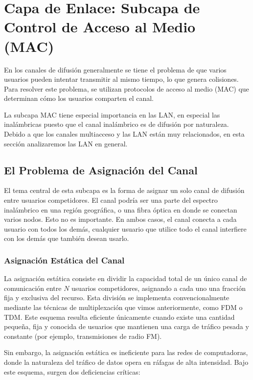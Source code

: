 \section{Capa de Enlace: Subcapa de Control de Acceso al Medio (MAC)}

En los canales de difusión generalmente se tiene el problema de que varios usuarios pueden intentar transmitir al mismo tiempo, lo que genera colisiones. Para resolver este problema, se utilizan protocolos de acceso al medio (MAC) que determinan cómo los usuarios comparten el canal. 

La subcapa MAC tiene especial importancia en las LAN, en especial las inalámbricas puesto que el canal inalámbrico es de difusión por naturaleza. Debido a que los canales multiacceso y las LAN están muy relacionados, en esta sección analizaremos las LAN en general.

\subsection{El Problema de Asignación del Canal}

El tema central de esta subcapa es la forma de asignar un solo canal de difusión entre usuarios competidores. El canal podría ser una parte del espectro inalámbrico en una región geográfica, o una fibra óptica en donde se conectan varios nodos. Esto no es importante. En ambos casos, el canal conecta a cada usuario con todos los demás, cualquier usuario que utilice todo el canal interfiere con los demás
que también desean usarlo.

\subsubsection{Asignación Estática del Canal}

La asignación estática consiste en dividir la capacidad total de un único canal de comunicación entre $N$ usuarios competidores, asignando a cada uno una fracción fija y exclusiva del recurso. Esta división se implementa convencionalmente mediante las técnicas de multiplexación que vimos anteriormente, como FDM o TDM. Este esquema resulta eficiente únicamente cuando existe una cantidad pequeña, fija y conocida de usuarios que mantienen una carga de tráfico pesada y constante (por ejemplo, transmisiones de radio FM).

Sin embargo, la asignación estática es ineficiente para las redes de computadoras, donde la naturaleza del tráfico de datos opera en ráfagas de alta intensidad. Bajo este esquema, surgen dos deficiencias críticas:

